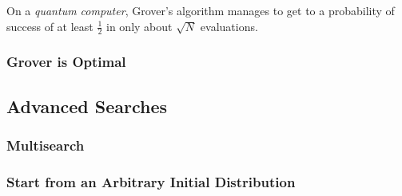 On a {\sl quantum computer}, Grover's algorithm manages to get 
to a probability of success of at least $\frac{1}{2}$ 
in only about $\sqrt{N}$ evaluations.  

\subsubsection{Grover is Optimal}


\subsection{Advanced Searches}

\subsubsection{Multisearch}

\subsubsection{Start from an Arbitrary Initial Distribution}


%
